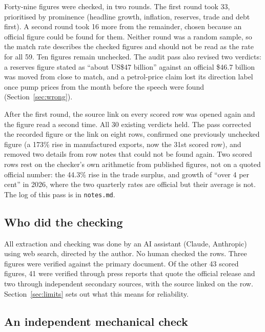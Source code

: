 \documentclass[11pt]{article}
\begin{document}
Forty-nine figures were checked, in two rounds. The first round took 33, prioritised by prominence (headline growth, inflation, reserves, trade and debt first). A second round took 16 more from the remainder, chosen because an official figure could be found for them. Neither round was a random sample, so the match rate describes the checked figures and should not be read as the rate for all 59. Ten figures remain unchecked. The audit pass also revised two verdicts: a reserves figure stated as ``about US\$47 billion'' against an official \$46.7 billion was moved from close to match, and a petrol-price claim lost its direction label once pump prices from the month before the speech were found (Section~\ref{sec:wrong}).

After the first round, the source link on every scored row was opened again and the figure read a second time. All 30 existing verdicts held. The pass corrected the recorded figure or the link on eight rows, confirmed one previously unchecked figure (a 173\% rise in manufactured exports, now the 31st scored row), and removed two details from row notes that could not be found again. Two scored rows rest on the checker's own arithmetic from published figures, not on a quoted official number: the 44.3\% rise in the trade surplus, and growth of ``over 4 per cent'' in 2026, where the two quarterly rates are official but their average is not. The log of this pass is in \texttt{notes.md}.

\subsection{Who did the checking}

All extraction and checking was done by an AI assistant (Claude, Anthropic) using web search, directed by the author. No human checked the rows. Three figures were verified against the primary document. Of the other 43 scored figures, 41 were verified through press reports that quote the official release and two through independent secondary sources, with the source linked on the row. Section~\ref{sec:limits} sets out what this means for reliability.

\subsection{An independent mechanical check}
\end{document}
